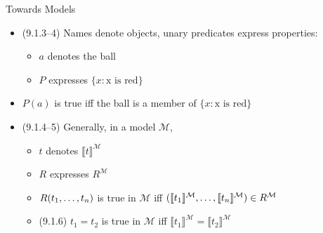 \begin{frame}{Towards Models}

	\begin{itemize}
	
		\item (9.1.3--4) Names denote objects, unary predicates express properties:
		
		\begin{itemize}
		
			\item $a$ denotes the ball
				
			\item $P$ expresses $\{x:\text{x is red}\}$
		
		\end{itemize}
		
		\item $P(a)$ is true iff the ball is a member of $\{x:\text{x is red}\}$ 
		
		\item (9.1.4--5) Generally, in a model $\mathcal{M}$,
	
			\begin{itemize}
			
				\item $t$ denotes $\llbracket t\rrbracket^\mathcal{M}$
				
				\item $R$ expresses $R^\mathcal{M}$
				
				\item $R(t_1, \mathellipsis, t_n)$ is true in $\mathcal{M}$ iff $(\llbracket t_1\rrbracket^\mathcal{M}, \mathellipsis, \llbracket t_n\rrbracket^\mathcal{M})\in R^\mathcal{M}$
				
				\item (9.1.6) $t_1=t_2$ is true in $\mathcal{M}$ iff $\llbracket t_1\rrbracket^\mathcal{M}=\llbracket t_2\rrbracket^\mathcal{M}$
			
			\end{itemize}

	\end{itemize}

\end{frame}

